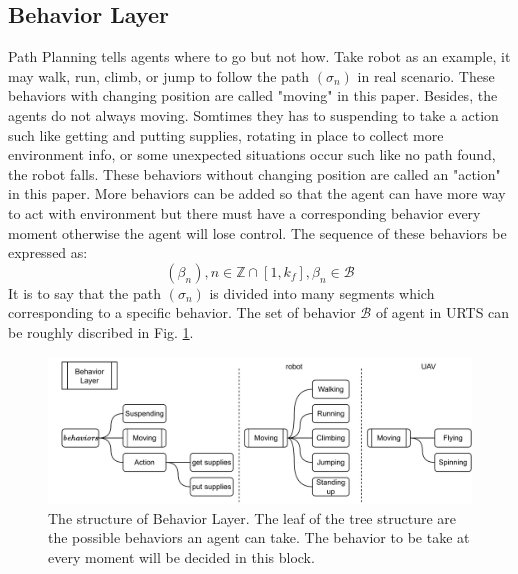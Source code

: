 \documentclass{ieeeaccess}
\begin{document}
\subsection{Behavior Layer}
Path Planning tells agents where to go but not how. Take robot as an example, it may walk, run, climb, or jump to follow the path $(\sigma_n)$ in real scenario. These behaviors with changing position are called "moving" in this paper. Besides, the agents do not always moving. Somtimes they has to suspending to take a action such like getting and putting supplies, rotating in place to collect more environment info, or some unexpected situations occur such like no path found, the robot falls. These behaviors without changing position are called an "action" in this paper. More behaviors can be added so that the agent can have more way to act with environment but there must have a corresponding behavior every moment otherwise the agent will lose control. The sequence of these behaviors be expressed as:
\begin{equation}
    (\beta_n), n\in\mathbb{Z}\cap[1,k_f], \beta_n\in\mathcal{B}
\end{equation}
It is to say that the path $(\sigma_n)$ is divided into many segments which corresponding to a specific behavior. The set of behavior $\mathcal{B}$ of agent in URTS can be roughly discribed in Fig. \ref{fig:behavior}.

\begin{figure}[htbp]
    \centering
    \includegraphics[scale=.5]{fig/behavior.pdf}\caption{The structure of Behavior Layer. The leaf of the tree structure are the possible behaviors an agent can take. The behavior to be take at every moment will be decided in this block.}%
    \label{fig:behavior}
\end{figure}
\end{document}
